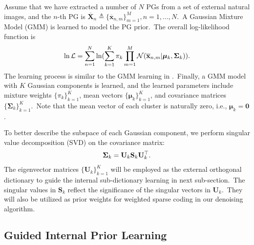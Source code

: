 \documentclass[10pt,twocolumn,letterpaper]{article}
\begin{document}
Assume that we have extracted a number of $N$ PGs from a set of external natural images, and the $n$-th PG is $\mathbf{\overline{X}}_{n}\triangleq \{\mathbf{\overline{x}}_{n,m}\}_{m=1}^{M}, n=1,...,N$.\ A Gaussian Mixture Model (GMM) is learned to model the PG prior.\ The overall log-likelihood function is
\vspace{-3mm}
\begin{equation}\label{equ1}\vspace{-2mm}
\begin{split}
\ln\mathcal{L}=\sum_{n=1}^{N} \ln(\sum_{k=1}^{K}\pi_{k}\prod_{m=1}^{M}\mathcal{N}(\mathbf{\overline{x}}_{n,m}|\bm{\mu}_{k},\mathbf{\Sigma}_{k})).
\end{split}
\end{equation}
The learning process is similar to the GMM learning in \cite{pgpd,epll}.\ Finally, a GMM model with $K$ Gaussian components is learned, and the learned parameters include mixture weights $\{\pi_{k}\}_{k=1}^{K}$, mean vectors $\{\bm{\mu}_{k}\}_{k=1}^{K}$, and covariance matrices $\{\mathbf{\Sigma}_{k}\}_{k=1}^{K}$.\ Note that the mean vector of each cluster is naturally zero, i.e., $\bm{\mu}_{k}=\mathbf{0}$.  

To better describe the subspace of each Gaussian component, we perform singular value decomposition (SVD) on the covariance matrix:
\vspace{-2mm}
\begin{equation}\label{equ2}\vspace{-2mm}
\mathbf{\Sigma}_{k}=\mathbf{U}_{k}\mathbf{S}_{k}\mathbf{U}_{k}^{\top}.
\end{equation}
The eigenvector matrices $\{\mathbf{U}_{k}\}_{k=1}^{K}$ will be employed as the external orthogonal dictionary to guide the internal sub-dictionary learning in next sub-section.\ The singular values in $\mathbf{S}_{k}$ reflect the significance of the singular vectors in $\mathbf{U}_{k}$.\ They  will also be utilized as prior weights for weighted sparse coding in our denoising algorithm.


\vspace{2mm}
\subsection{Guided Internal Prior Learning}
\end{document}

